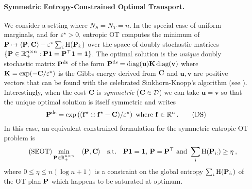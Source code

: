 \paragraph{Symmetric Entropy-Constrained Optimal Transport.} 
We consider a setting where $N_S = N_T = n$. In the special case of uniform
marginals, and for $\varepsilon^\star > 0$, entropic OT computes the minimum of $\mathbf{P}
\mapsto \langle \mathbf{P}, \mathbf{C} \rangle -\varepsilon^\star \sum_{i} \operatorname{H}(\mathbf{P}_{i:})$
over the space of doubly stochastic matrices $\{\mathbf{P} \in \mathbb{R}_{+}^{n \times n} :
\mathbf{P} \bm{1} = \mathbf{P}^\top \bm{1} =\bm{1}\}$. The optimal solution is the
\emph{unique} doubly stochastic matrix $\mathbf{P}^{\mathrm{ds}}$ of the form $\mathbf{P}^{\mathrm{ds}}=\operatorname{diag}(\mathbf{u})\mathbf{K}
\operatorname{diag}(\mathbf{v})$ where $\mathbf{K} = \exp(-\mathbf{C}/\varepsilon^\star)$ is the Gibbs energy derived from
$\mathbf{C}$ and $\mathbf{u}, \mathbf{v}$ are positive vectors that can be found with
the celebrated Sinkhorn-Knopp’s algorithm \citep{cuturi2013sinkhorn,
sinkhorn1964relationship} (see ). Interestingly, when the cost $\mathbf{C}$ is \emph{symmetric}
(\eg $\mathbf{C} \in \mathcal{D}$) we can take $\mathbf{u} = \mathbf{v}$ \cite[Section
5.2]{idel2016review} so that the unique optimal solution is itself symmetric and writes  
\begin{align}\label{eq:plan_sym_sinkhorn}
    \mathbf{P}^{\mathrm{ds}} = \exp \left((\mathbf{f}^\star \oplus \mathbf{f}^\star - \mathbf{C}) / \varepsilon^\star \right) \text{ where } \mathbf{f} \in \mathbb{R}^n \,.
\tag{DS}
\end{align}
In this case, an equivalent constrained formulation for the symmetric entropic OT problem is
\begin{equation}
\tag{SEOT}
\label{eq:entropy_constrained_OT}
\min_{\mathbf{P} \in \mathbb{R}_{+}^{n \times n}} \quad \langle \mathbf{P}, \mathbf{C} \rangle \quad \text{s.t.} \quad \mathbf{P} \bm{1} = \bm{1}, \: \mathbf{P} = \mathbf{P}^\top \text{ and } \sum_i \operatorname{H}(\mathbf{P}_{i:}) \geq \eta \:,
\end{equation}
where $0 \leq \eta \leq n (\log n + 1)$ is a constraint on the global entropy $\sum_i \operatorname{H}(\mathbf{P}_{i:})$ of the OT plan $\mathbf{P}$ which happens to be saturated at optimum.

